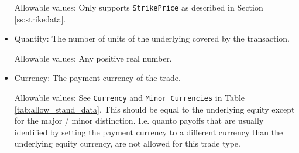 \begin{itemize}
Allowable values: Only supports \lstinline!StrikePrice! as described in Section \ref{ss:strikedata}.
	    
\item Quantity: The number of units of the underlying covered by the transaction.

Allowable values: Any positive real number.

\item Currency: The payment currency of the trade.

Allowable values: See \lstinline!Currency! and \lstinline!Minor Currencies! in Table \ref{tab:allow_stand_data}. This
should be equal to the underlying equity except for the major / minor distinction. I.e. quanto payoffs that are usually
identified by setting the payment currency to a different currency than the underlying equity currency, are not allowed
for this trade type.
    

\end{itemize}
